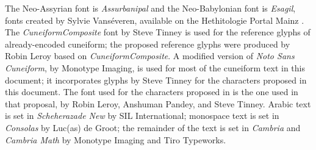 \documentclass[10pt, a4paper, twoside]{article}
\newcommand{\changed}[1]{\highLight{#1}}
\begin{document}
The Neo-Assyrian font is \emph{Assurbanipal} and the Neo-Babylonian font is \emph{Esagil},
fonts created by Sylvie Vanséveren,
available on the Hethitologie Portal Mainz \cite{Vanséveren2021}.
The \emph{CuneiformComposite} font by Steve Tinney is used 
for the reference glyphs of already-encoded cuneiform;
the proposed reference glyphs were produced by Robin Leroy based on
\emph{CuneiformComposite}.
A modified version of \emph{Noto Sans Cuneiform}, by Monotype Imaging,
is used for most of the cuneiform text in this document; it incorporates glyphs
by Steve Tinney for the characters proposed in this document.
The font used for the characters proposed in \cite{L2/24-210R}
is the one used in that proposal, by Robin Leroy, Anshuman Pandey, and Steve Tinney.
Arabic text is set in \emph{Scheherazade New} by SIL International;
monospace text is set in \emph{Consolas} by Luc(as) de Groot;
the remainder of the text is set in \emph{Cambria} and \emph{Cambria Math} by Monotype Imaging and Tiro Typeworks.
\hspace*{\fill}{\xsuxfont 𒀭𒊺𒉀 𒍠𒊩}

\nocite{DCCLT}
\printbibheading[heading=bibintoc]
\printbibliography[heading=subbibintoc,title={Artefacts},type=artwork]
\printbibliography[heading=subbibintoc,title={ISO and Unicode documents},nottype=artwork,keyword=unicode]
\printbibliography[heading=subbibintoc,title={Online corpora and related projects},nottype=artwork,keyword=reference]
\printbibliography[heading=subbibintoc,title={Other documents},nottype=artwork,notkeyword=unicode,notkeyword=reference]
%
\end{document}
